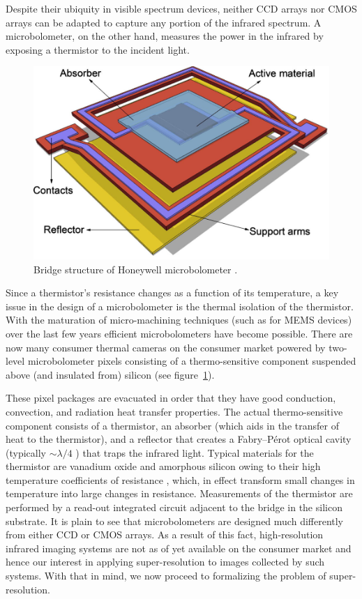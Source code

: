Despite their ubiquity in visible spectrum devices, neither CCD arrays nor CMOS arrays can be adapted to capture any portion of the infrared spectrum.
%
A microbolometer, on the other hand, measures the power in the infrared by exposing a thermistor to the incident light.
%
\begin{figure}[!htbp]
	\center
	\includegraphics[width=\linewidth,keepaspectratio]{figures/background/microbolometer2.png}
	\caption{Bridge structure of Honeywell microbolometer \cite{KESIM2014245}.}
	\label{fig:microbolometer}
\end{figure}
%
Since a thermistor's resistance changes as a function of its temperature, a key issue in the design of a microbolometer is the thermal isolation of the thermistor.
%
With the maturation of micro-machining techniques (such as for MEMS devices) over the last few years efficient microbolometers have become possible.
%
There are now many consumer thermal cameras on the consumer market powered by two-level microbolometer pixels consisting of a thermo-sensitive component suspended above (and insulated from) silicon (see figure~\ref{fig:microbolometer}).

These pixel packages are evacuated in order that they have good conduction, convection, and radiation heat transfer properties.
%
The actual thermo-sensitive component consists of a thermistor, an absorber (which aids in the transfer of heat to the thermistor), and a reflector that creates a Fabry–Pérot optical cavity (typically \({\sim}\lambda/4\) \cite{bolometer}) that traps the infrared light.
%
Typical materials for the thermistor are vanadium oxide and amorphous silicon owing to their high temperature coefficients of resistance \cite{bolometer}, which, in effect transform small changes in temperature into large changes in resistance.
%
Measurements of the thermistor are performed by a read-out integrated circuit adjacent to the bridge in the silicon substrate.
%
It is plain to see that microbolometers are designed much differently from either CCD or CMOS arrays.
%
As a result of this fact, high-resolution infrared imaging systems are not as of yet available on the consumer market and hence our interest in applying super-resolution to images collected by such systems.
%
With that in mind, we now proceed to formalizing the problem of super-resolution.

